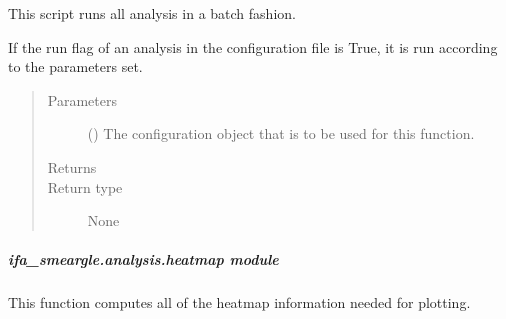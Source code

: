 \documentclass[letterpaper,10pt,english]{sphinxmanual}
\begin{document}
\begin{fulllineitems}
\label{\detokenize{docstrings/ifa_smeargle.analysis.base_functions:ifa_smeargle.analysis.base_functions.script_batch_analysis}}
This script runs all analysis in a batch fashion.

If the run flag of an analysis in the configuration file is
True, it is run according to the parameters set.
\begin{quote}\begin{description}
\item[{Parameters}] \leavevmode
{} () \textendash{} The configuration object that is to be used for this
function.

\item[{Returns}] \leavevmode


\item[{Return type}] \leavevmode
None

\end{description}\end{quote}

\end{fulllineitems}



\subparagraph{ifa\_smeargle.analysis.heatmap module}
\label{\detokenize{docstrings/ifa_smeargle.analysis.heatmap:module-ifa_smeargle.analysis.heatmap}}\label{\detokenize{docstrings/ifa_smeargle.analysis.heatmap:ifa-smeargle-analysis-heatmap-module}}\label{\detokenize{docstrings/ifa_smeargle.analysis.heatmap::doc}}
This function computes all of the heat\sphinxhyphen{}map information needed for
plotting.
\end{document}
